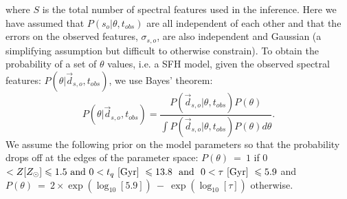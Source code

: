 \documentclass[useAMS,usenatbib]{mn2e}
\begin{document}
where $S$ is the total number of spectral features used in the inference. Here we have assumed that $P(s_{o}|\theta, t_{obs})$ are all independent of each other and that the errors on the observed features, $\sigma_{s, o}$, are also independent and Gaussian (a simplifying assumption but difficult to otherwise constrain). To obtain the probability of a set of $\theta$ values, i.e. a SFH model, given the observed spectral features: $P(\theta|\vec{d}_{s,o}, t_{obs})$, we use Bayes' theorem:
 \begin{equation}\label{eq:bayes}
P(\theta|\vec{d}_{s,o}, t_{obs}) = \frac{P(\vec{d}_{s,o}|\theta, t_{obs})P(\theta)}{\int P(\vec{d}_{s,o} |\theta, t_{obs})P(\theta) d\theta}.
\end{equation}
We assume the following prior on the model parameters so that the probability drops off at the edges of the parameter space: ${P(\theta)~=~1}$ if 0 $< Z [Z_{\odot}] \leq 1.5 \text{ and } 0 < t_q ~\rm{[Gyr]}~ \leq 13.8 ~ \text{ and } ~ 0 < \tau  ~\rm{[Gyr]}~ \leq 5.9$ and ${P(\theta)~=~2\times\exp\left(\log_{10}[5.9]\right)~-~\exp\left(\log_{10}[\tau]\right)}$ otherwise.


\end{document}
